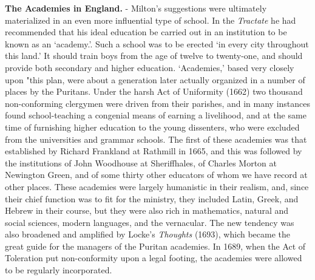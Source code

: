 \documentclass[]{book}
\begin{document}
\textbf{The Academies in England.} - Milton's suggestions were ultimately materialized in an even more influential type of school. In the \emph{Tractate} he had recommended that his ideal education be carried out in an institution to be known as an `academy.'. Such a school was to be erected `in every city throughout this land.' It should train boys from the age of twelve to twenty-one, and should provide both secondary and higher education. `Academies,' based very closely upon "this plan, were about a generation later actually organized in a number of places by the Puritans. Under the harsh Act of Uniformity (1662) two thousand non-conforming clergymen were driven from their parishes, and in many instances found school-teaching a congenial means of earning a livelihood, and at the same time of furnishing higher education to the young dissenters, who were excluded from the universities and grammar schools. The first of these academies was that established by Richard Frankland at Rathmill in 1665, and this was followed by the institutions of John Woodhouse at Sheriffhales, of Charles Morton at Newington Green, and of some thirty other educators of whom we have record at other places. These academies were largely humanistic in their realism, and, since their chief function was to fit for the ministry, they included Latin, Greek, and Hebrew in their course, but they were also rich in mathematics, natural and social sciences, modern languages, and the vernacular. The new tendency was also broadened and amplified by Locke's \emph{Thoughts} (1693), which became the great guide for the managers of the Puritan academies. In 1689, when the Act of Toleration put non-conformity upon a legal footing, the academies were allowed to be regularly incorporated.
\end{document}
